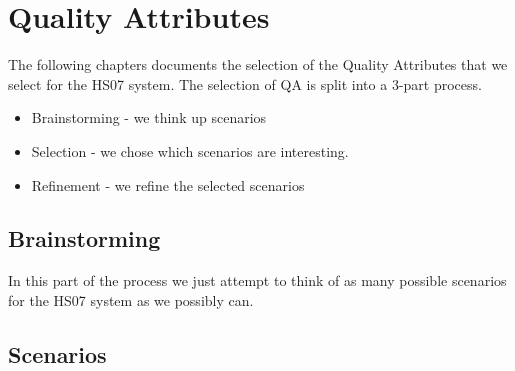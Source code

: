 \documentclass[a4paper,10pt]{article}
\begin{document}
\section{Quality Attributes}
The following chapters documents the selection of the Quality Attributes that we 
select for the HS07 system. The selection of QA is split into a 3-part process.
\begin{itemize}
\item Brainstorming - we think up scenarios
\item Selection - we chose which scenarios are interesting.
\item Refinement - we refine the selected scenarios
\end{itemize}
\subsection{Brainstorming}
In this part of the process we just attempt to think of as many possible scenarios for the HS07 system as we possibly can. 

\subsection{Scenarios}
\end{document}
